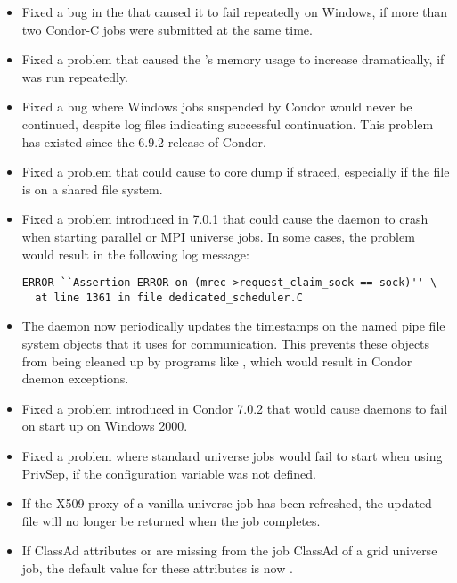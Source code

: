 \begin{itemize}

\item Fixed a bug in the  that caused it to fail repeatedly
on Windows, if more than two Condor-C jobs were submitted at the same time.

\item Fixed a problem that caused the 's memory usage
to increase dramatically, if  was run repeatedly.

\item Fixed a bug where Windows jobs suspended by Condor would never
be continued, despite log files indicating successful continuation.
This problem has existed since the 6.9.2 release of Condor.

\item Fixed a problem that could cause  to core dump
if straced, especially if the  file is on a shared
file system.

\item Fixed a problem introduced in 7.0.1 that could cause the 
daemon to crash when starting parallel or MPI universe jobs.  In some cases,
the problem would result in the following log message:

\footnotesize
\begin{verbatim}
ERROR ``Assertion ERROR on (mrec->request_claim_sock == sock)'' \
  at line 1361 in file dedicated_scheduler.C
\end{verbatim}
\normalsize

\item The  daemon now periodically updates the timestamps on
the named pipe file system objects that it uses for communication.
This prevents these objects from being cleaned up by programs like
\Prog{tmpwatch}, which would result in Condor daemon exceptions.

\item Fixed a problem introduced in Condor 7.0.2 that would cause daemons
to fail on start up on Windows 2000.

\item Fixed a problem where standard universe jobs would fail to start
when using PrivSep, if the \Macro{PROCD\_ADDRESS} configuration variable was not
defined.

\item If the X509 proxy of a vanilla universe job has been refreshed, the
updated file will no longer be returned when the job completes.

\item If ClassAd attributes  or  are
missing from the job ClassAd of a grid universe job,
the default value for these attributes is now .

\end{itemize}


